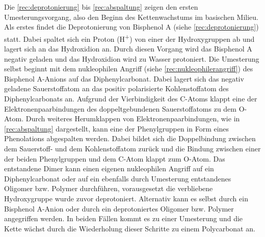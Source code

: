 Die \autoref{rec:deprotonierung} bis \autoref{rec:abspaltung} zeigen den ersten
Umesterungsvorgang, also den Beginn des Kettenwachstums im basischen Milieu. Als
erstes findet die Deprotonierung von Bisphenol A (siehe
\autoref{rec:deprotonierung}) statt. Dabei spaltet sich ein Proton
(H\textsuperscript{+}) von einer der Hydroxygruppen ab und lagert sich an das
Hydroxidion an. Durch diesen Vorgang wird das Bisphenol A negativ geladen und
das Hydroxidion wird zu Wasser protoniert. Die Umesterung selbst beginnt mit dem
nukleophilen Angriff (siehe \autoref{rec:nukleophilerangriff}) des Bisphenol
A-Anions auf das Diphenylcarbonat. Dabei lagert sich das negativ geladene
Sauerstoffatom an das positiv polarisierte Kohlenstoffatom des Diphenylcarbonats
an. Aufgrund der Vierbindigkeit des C-Atoms \glqq klappt\grqq{} eine der
Elektronenpaarbindungen des doppeltgebundenen Sauerstoffatoms zu dem O-Atom.
Durch weiteres \glqq Herumklappen\grqq{} von Elektronenpaarbindungen, wie in
\autoref{rec:abspaltung} dargestellt, kann eine der Phenylgruppen in Form eines
Phenolations abgespalten werden. Dabei bildet sich die Doppelbindung zwischen
dem Sauerstoff- und dem Kohlenstoffatom zurück und die Bindung zwischen einer
der beiden Phenylgruppen und dem C-Atom \glqq klappt\grqq{} zum O-Atom. Das
entstandene Dimer kann einen eigenen nukleophilen Angriff auf ein
Diphenylcarbonat oder auf ein ebenfalls durch Umesterung entstandenes Oligomer
bzw. Polymer durchführen, vorausgesetzt die verbliebene Hydroxygruppe wurde
zuvor deprotoniert. Alternativ kann es selbst durch ein Bisphenol A-Anion oder
durch ein deprotoniertes Oligomer bzw. Polymer angegriffen werden. In beiden
Fällen kommt es zu einer Umesterung und die Kette wächst durch die Wiederholung
dieser Schritte zu einem Polycarbonat an.

